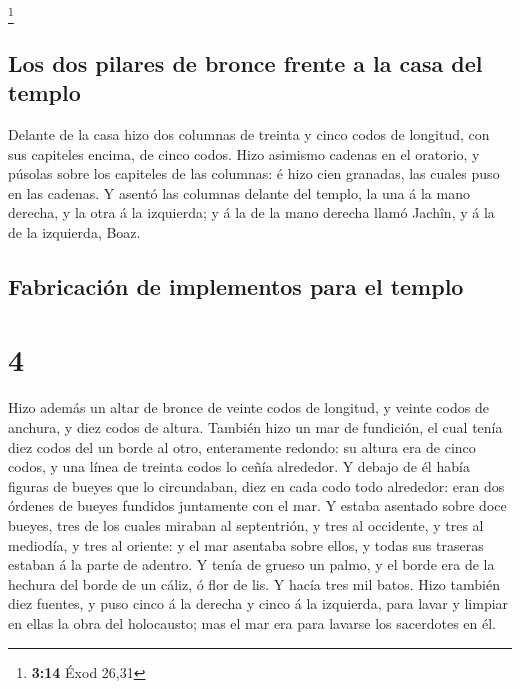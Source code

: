 \footnote{\textbf{3:14} Éxod 26,31}

\hypertarget{los-dos-pilares-de-bronce-frente-a-la-casa-del-templo}{%
\subsection{Los dos pilares de bronce frente a la casa del
templo}\label{los-dos-pilares-de-bronce-frente-a-la-casa-del-templo}}

 Delante de la casa hizo dos columnas de treinta y cinco
codos de longitud, con sus capiteles encima, de cinco codos.
 Hizo asimismo cadenas en el oratorio, y púsolas sobre
los capiteles de las columnas: é hizo cien granadas, las cuales puso en
las cadenas.  Y asentó las columnas delante del templo,
la una á la mano derecha, y la otra á la izquierda; y á la de la mano
derecha llamó Jachîn, y á la de la izquierda, Boaz.

\hypertarget{fabricaciuxf3n-de-implementos-para-el-templo}{%
\subsection{Fabricación de implementos para el
templo}\label{fabricaciuxf3n-de-implementos-para-el-templo}}

\hypertarget{section-3}{%
\section{4}\label{section-3}}

 Hizo además un altar de bronce de veinte codos de
longitud, y veinte codos de anchura, y diez codos de altura.
 También hizo un mar de fundición, el cual tenía diez
codos del un borde al otro, enteramente redondo: su altura era de cinco
codos, y una línea de treinta codos lo ceñía alrededor.  Y
debajo de él había figuras de bueyes que lo circundaban, diez en cada
codo todo alrededor: eran dos órdenes de bueyes fundidos juntamente con
el mar.  Y estaba asentado sobre doce bueyes, tres de los
cuales miraban al septentrión, y tres al occidente, y tres al mediodía,
y tres al oriente: y el mar asentaba sobre ellos, y todas sus traseras
estaban á la parte de adentro.  Y tenía de grueso un
palmo, y el borde era de la hechura del borde de un cáliz, ó flor de
lis. Y hacía tres mil batos.  Hizo también diez fuentes, y
puso cinco á la derecha y cinco á la izquierda, para lavar y limpiar en
ellas la obra del holocausto; mas el mar era para lavarse los sacerdotes
en él.

